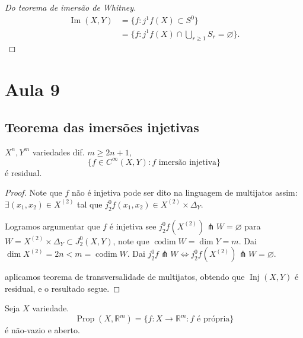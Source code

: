 \begin{proof}[Do teorema de imersão de Whitney]\leavevmode
\begin{align*}
\operatorname{Im}(X,Y)&=\{f : j^1f(X) \subset S^0\}\\
&=\{ f : j^1f(X) \cap \bigcup_{r \geq  1}S_r = \varnothing\}.
\end{align*}
\end{proof}

\section{Aula 9}

\subsection{Teorema das imersões injetivas}

\begin{thm}\leavevmode
\(X^n, Y^m\) variedades dif. \(m \geq  2n+1\),
\[\{f \in C^\infty(X,Y): f \text{ imersão injetiva} \}\]
é residual.
\end{thm}
\begin{proof}\leavevmode
Note que $f$ não é injetiva pode ser dito na linguagem de multijatos assim: \(\exists  (x_1,x_2) \in X^{(2)}\) tal que \(j^0_2f(x_1,x_2) \in X^{(2)}\times \Delta_Y\).

Logramos argumentar que $f$ é injetiva see \(j^0_2f(X^{(2)}) \pitchfork W= \varnothing\) para \(W=X^{(2)}\times \Delta_Y \subset J^0_2(X,Y)\), note que \(\operatorname{codim} W=\dim Y=m\). Dai \(\dim X^{(2)}=2n<m=\operatorname{codim} W\). Dai \(j^0_2 f \pitchfork W \iff j^0_2f(X^{(2)}) \pitchfork W= \varnothing\).

aplicamos teorema de transversalidade de multijatos, obtendo que \(\operatorname{In j}(X,Y)\) é residual, e o resultado segue.
\end{proof}

\begin{lemma}\leavevmode
Seja \(X\) variedade.
\[\operatorname{Pr op}(X, \mathbb{R}^m)=\{f: X \to \mathbb{R}^m: f \text{ é própria} \}\]
é não-vazio e aberto.
\end{lemma}

